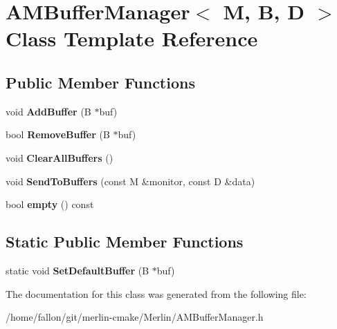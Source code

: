 \hypertarget{classAMBufferManager}{}\section{A\+M\+Buffer\+Manager$<$ M, B, D $>$ Class Template Reference}
\label{classAMBufferManager}
\subsection*{Public Member Functions}
\begin{DoxyCompactItemize}
\item 
\mbox{\label{classAMBufferManager_a13820bc70783c397947c0f1bba2f58fe}} 
void {\bfseries Add\+Buffer} (B $\ast$buf)
\item 
\mbox{\label{classAMBufferManager_a951f25ba53f19c8f9eba4f3030275d08}} 
bool {\bfseries Remove\+Buffer} (B $\ast$buf)
\item 
\mbox{\label{classAMBufferManager_ad0b5cb9c008ef288566afcbd3389060a}} 
void {\bfseries Clear\+All\+Buffers} ()
\item 
\mbox{\label{classAMBufferManager_a5ffab8073fc4b5d7255bd723ffe9fde8}} 
void {\bfseries Send\+To\+Buffers} (const M \&monitor, const D \&data)
\item 
\mbox{\label{classAMBufferManager_a3f266c61b388badd6c4d37ffd16e4d09}} 
bool {\bfseries empty} () const
\end{DoxyCompactItemize}
\subsection*{Static Public Member Functions}
\begin{DoxyCompactItemize}
\item 
\mbox{\label{classAMBufferManager_a031dca55ec86390f314ce595871519c8}} 
static void {\bfseries Set\+Default\+Buffer} (B $\ast$buf)
\end{DoxyCompactItemize}


The documentation for this class was generated from the following file\+:\begin{DoxyCompactItemize}
\item 
/home/fallon/git/merlin-\/cmake/\+Merlin/A\+M\+Buffer\+Manager.\+h\end{DoxyCompactItemize}
